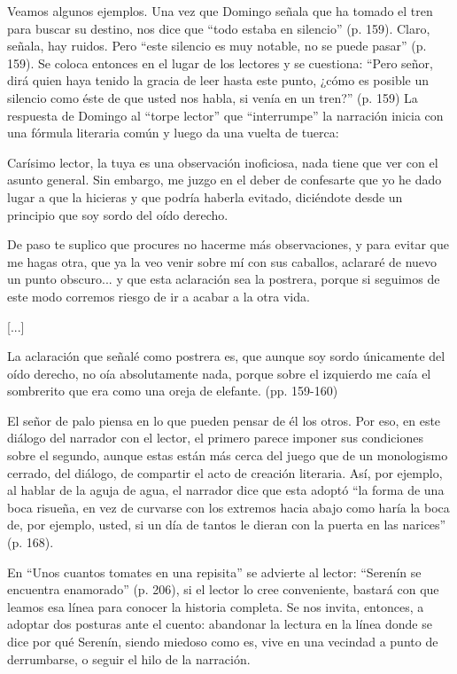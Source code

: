 \documentclass[14pt,twoside,final]{extbook} %
\begin{document}
Veamos algunos ejemplos. Una vez que Domingo señala que ha tomado el tren para buscar su destino, nos dice que ``todo estaba en silencio'' (p. 159). Claro, señala, hay ruidos. Pero ``este silencio es muy notable, no se puede pasar'' (p. 159). Se coloca entonces en el lugar de los lectores y se cuestiona: ``Pero señor, dirá quien haya tenido la gracia de leer hasta este punto, ¿cómo es posible un silencio como éste de que usted nos habla, si venía en un tren?'' (p. 159) La respuesta de Domingo al ``torpe lector'' que ``interrumpe'' la narración inicia con una fórmula literaria común y luego da una vuelta de tuerca:
\begin{quoting}
Carísimo lector, la tuya es una observación inoficiosa, nada tiene que ver con el asunto general. Sin embargo, me juzgo en el deber de confesarte que yo he dado lugar a que la hicieras y que podría haberla evitado, diciéndote desde un principio que soy sordo del oído derecho.

De paso te suplico que procures no hacerme más observaciones, y para evitar que me hagas otra, que ya la veo venir sobre mí con sus caballos, aclararé de nuevo un punto obscuro... y que esta aclaración sea la postrera, porque si seguimos de este modo corremos riesgo de ir a acabar a la otra vida.

\centerline{[...]}

La aclaración que señalé como postrera es, que aunque soy sordo únicamente del oído derecho, no oía absolutamente nada, porque sobre el izquierdo me caía el sombrerito que era como una oreja de elefante. (pp. 159-160)
\end{quoting}
El señor de palo piensa en lo que pueden pensar de él los otros. Por eso, en este diálogo del narrador con el lector, el primero parece imponer sus condiciones sobre el segundo, aunque estas están más cerca del juego que de un monologismo cerrado, del diálogo, de compartir el acto de creación literaria. Así, por ejemplo, al hablar de la aguja de agua, el narrador dice que esta adoptó ``la forma de una boca risueña, en vez de curvarse con los extremos hacia abajo como haría la boca de, por ejemplo, usted, si un día de tantos le dieran con la puerta en las narices'' (p. 168).

En ``Unos cuantos tomates en una repisita'' se advierte al lector: ``Serenín se encuentra enamorado'' (p. 206), si el lector lo cree conveniente, bastará con que leamos esa línea para conocer la historia completa. Se nos invita, entonces, a adoptar dos posturas ante el cuento: abandonar la lectura en la línea donde se dice por qué Serenín, siendo miedoso como es, vive en una vecindad a punto de derrumbarse, o seguir el hilo de la narración.
\end{document}

